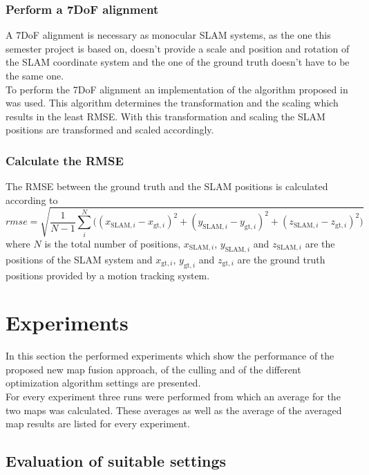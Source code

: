 \subsubsection{Perform a 7DoF alignment}
A 7DoF alignment is necessary as monocular \ac{SLAM} systems, as the one this semester project is based on, doesn't provide a scale and position and rotation of the \ac{SLAM} coordinate system and the one of the ground truth doesn't have to be the same one.\\

To perform the 7DoF alignment an implementation of the algorithm proposed in \cite{Umeyama1991} was used. This algorithm determines the transformation and the scaling which results in the least \ac{RMSE}. With this transformation and scaling the \ac{SLAM} positions are transformed and scaled accordingly.

\subsubsection{Calculate the \acf{RMSE}}
The \acf{RMSE} between the ground truth and the \ac{SLAM} positions is calculated according to
\begin{equation}
  \textit{rmse} = \sqrt{\frac{1}{N - 1} \sum_i^N \big( (x_{\text{SLAM},i} - x_{\text{gt},i})^2 + (y_{\text{SLAM},i} - y_{\text{gt},i})^2 + (z_{\text{SLAM},i} - z_{\text{gt},i})^2\big)}
\end{equation}
where $N$ is the total number of positions, $x_{\text{SLAM},i}$, $y_{\text{SLAM},i}$ and $z_{\text{SLAM},i}$ are the positions of the \ac{SLAM} system and $x_{\text{gt},i}$, $y_{\text{gt},i}$ and $z_{\text{gt},i}$ are the ground truth positions provided by a motion tracking system.

\section{Experiments}
\label{sec:experiments}

In this section the performed experiments which show the performance of the proposed new map fusion approach, of the culling and of the different optimization algorithm settings are presented.\\

For every experiment three runs were performed from which an average for the two maps was calculated. These averages as well as the average of the averaged map results are listed for every experiment.

\subsection{Evaluation of suitable settings}
\label{subsec:suitable_settings}

